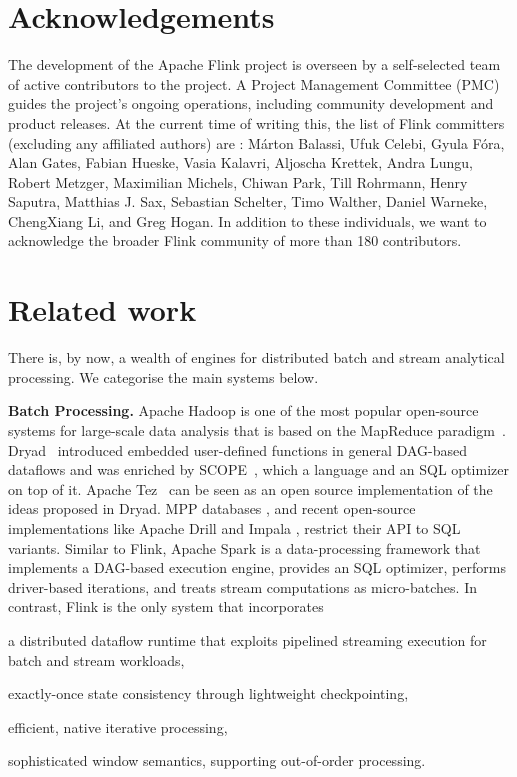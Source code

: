 \documentclass[11pt]{article}
\newcommand{\para}[1]{\vspace{2mm}\noindent\textbf{#1}}
\begin{document}
\vspace{-4mm}
\section{Acknowledgements}
\vspace{-2mm}
\label{sec:acknowledgements}
The development of the Apache Flink project is overseen by a self-selected team of active contributors to the project. A Project Management Committee (PMC) guides the project's ongoing operations, including community development and product releases. At the current time of writing this, the list of Flink committers (excluding any affiliated authors) are : M\'arton Balassi, Ufuk Celebi, Gyula F\'ora, Alan Gates, Fabian Hueske, Vasia Kalavri, Aljoscha Krettek, Andra Lungu, Robert Metzger, Maximilian Michels, Chiwan Park, Till Rohrmann, Henry Saputra, Matthias J. Sax, Sebastian Schelter, Timo Walther, Daniel Warneke, ChengXiang Li, and Greg Hogan. In addition to these individuals, we want to acknowledge the broader Flink community of more than 180 contributors. 

\vspace{-4mm}
\section{Related work}
\vspace{-2mm}
\label{sec:related}
There is, by now, a wealth of engines for distributed batch and stream analytical processing. We categorise the main systems below. 

\para{Batch Processing.} Apache Hadoop is one of the most popular open-source systems for large-scale data analysis that is based on the MapReduce paradigm~\cite{DBLP:journals/cacm/DeanG08}. Dryad~\cite{isard2007dryad} introduced embedded user-defined functions in general DAG-based dataflows and was enriched by SCOPE~\cite{scopeOptimizer}, which a language and an SQL optimizer on top of it. Apache Tez~\cite{saha2015apache} can be seen as an open source implementation of the ideas proposed in Dryad. MPP databases \cite{dewitt1990gamma}, and recent open-source implementations like Apache Drill and Impala \cite{kornacker2015impala}, restrict their API to SQL variants. Similar to Flink, Apache Spark \cite{DBLP:conf/hotcloud/ZahariaCFSS10} is a data-processing framework that implements a DAG-based execution engine, provides an SQL optimizer, performs driver-based iterations, and treats stream computations as micro-batches. In contrast, Flink is the only system that incorporates
\begin{inparaenum}[i)]
  \item a distributed dataflow runtime that exploits pipelined streaming execution for batch and stream workloads,
  \item exactly-once state consistency through lightweight checkpointing,
  \item efficient, native iterative processing,
  \item sophisticated window semantics, supporting out-of-order processing.
\end{inparaenum}
\end{document}

